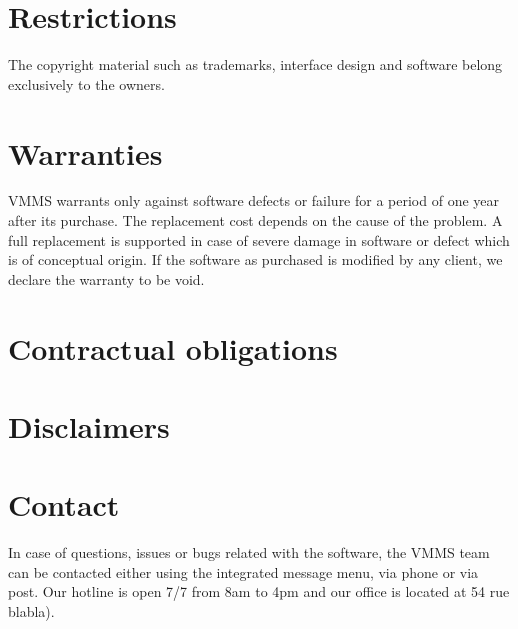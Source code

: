 \section{Restrictions}
The copyright material such as trademarks, interface design and software belong
exclusively to the owners.

\section{Warranties}
VMMS warrants only against software defects or failure for a period of one year
after its purchase. The replacement cost depends on the cause of the problem. A
full replacement is supported in case of severe damage in software or defect
which is of conceptual origin. If the software as purchased is modified by any
client, we declare the warranty to be void.

\section{Contractual obligations}

\section{Disclaimers}

\section{Contact}
In case of questions, issues or bugs related with the software, the VMMS team
can be contacted either using the integrated message menu, via phone or via
post. Our hotline is open 7/7 from 8am to 4pm and our office is located
at 54 rue blabla).
